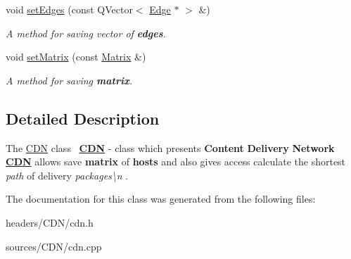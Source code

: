 \begin{DoxyCompactItemize}
\mbox{\label{class_c_d_n_a81e73410c0a68172b1994b655b5307a9}} 
void \mbox{\hyperlink{class_c_d_n_a81e73410c0a68172b1994b655b5307a9}{set\+Edges}} (const Q\+Vector$<$ \mbox{\hyperlink{class_edge}{Edge}} $\ast$ $>$ \&)
\begin{DoxyCompactList}\small\item\em A {\itshape method} for saving {\itshape vector} of {\bfseries{edges}}. \end{DoxyCompactList}\item 
\mbox{\label{class_c_d_n_a5f3459e7db0605584cff3273db5dcf99}} 
void \mbox{\hyperlink{class_c_d_n_a5f3459e7db0605584cff3273db5dcf99}{set\+Matrix}} (const \mbox{\hyperlink{class_matrix}{Matrix}} \&)
\begin{DoxyCompactList}\small\item\em A {\itshape method} for saving {\bfseries{matrix}}. \end{DoxyCompactList}\end{DoxyCompactItemize}


\subsection{Detailed Description}
The \mbox{\hyperlink{class_c_d_n}{C\+DN}} class~\newline
{\bfseries{\mbox{\hyperlink{class_c_d_n}{C\+DN}}}} -\/ class which presents {\bfseries{Content}} {\bfseries{Delivery}} {\bfseries{Network}} ~\newline
{\bfseries{\mbox{\hyperlink{class_c_d_n}{C\+DN}}}} allows save {\bfseries{matrix}} of {\bfseries{hosts}} and also gives access calculate the shortest {\itshape path} of delivery {\itshape packages\textbackslash{}n} . 

The documentation for this class was generated from the following files\+:\begin{DoxyCompactItemize}
\item 
headers/\+C\+D\+N/cdn.\+h\item 
sources/\+C\+D\+N/cdn.\+cpp\end{DoxyCompactItemize}
